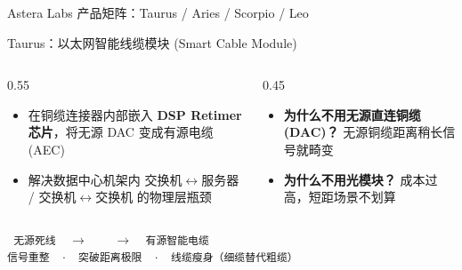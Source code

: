 \documentclass[aspectratio=169, 8pt, UTF8]{ctexbeamer}
\begin{document}
\begin{frame}{Astera Labs 产品矩阵：Taurus / Aries / Scorpio / Leo}
  \begin{block}{Taurus：以太网智能线缆模块 (Smart Cable Module)}
    \begin{columns}[T]
      \begin{column}{0.55\textwidth}
        \begin{itemize}
          \item 在铜缆连接器内部嵌入 \textbf{DSP Retimer 芯片}，将无源 DAC 变成有源电缆 (AEC)
          \item 解决数据中心机架内 交换机$\leftrightarrow$服务器 / 交换机$\leftrightarrow$交换机 的物理层瓶颈
        \end{itemize}
      \end{column}
      \begin{column}{0.45\textwidth}
        \begin{itemize}
          \item \textbf{为什么不用无源直连铜缆(DAC)？} 无源铜缆距离稍长信号就畸变
          \item \textbf{为什么不用光模块？} 成本过高，短距场景不划算
        \end{itemize}
      \end{column}
    \end{columns}
    \centering
    \texttt{%
    无源死线\ \ $\to$\ \ \ \ $\to$\ \ 有源智能电缆\\[2pt]
    信号重整\ \ $\cdot$\ \ 突破距离极限\ \ $\cdot$\ \ 线缆瘦身（细缆替代粗缆）%
    }
  \end{block}

  \vspace{-1pt}


\end{frame}
\end{document}
